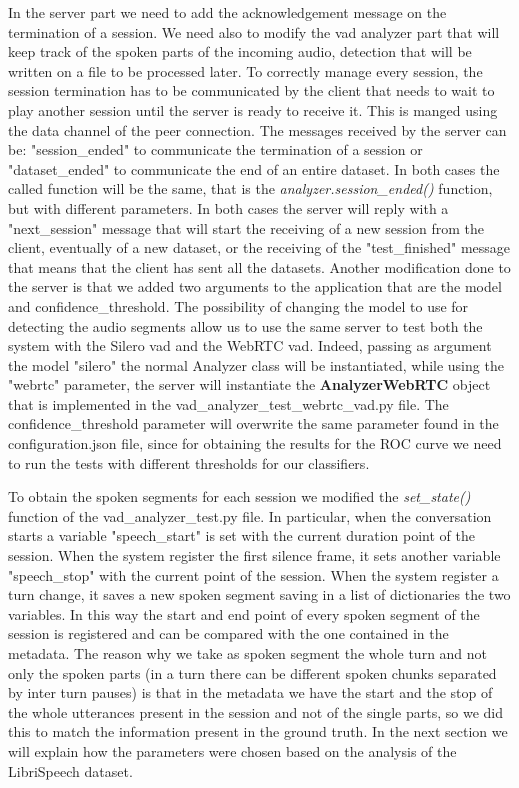 \documentclass[../main.tex]{subfiles}
\begin{document}
In the server part we need to add the acknowledgement message on the termination of a session. We need also to modify the vad analyzer part that will keep track of the spoken parts of the incoming audio, detection that will be written on a file to be processed later. To correctly manage every session, the session termination has to be communicated by the client that needs to wait to play another session until the server is ready to receive it. This is manged using the data channel of the peer connection. The messages received by the server can be: "session\_ended" to communicate the termination of a session or "dataset\_ended" to communicate the end of an entire dataset. In both cases the called function will be the same, that is the \textit{analyzer.session\_ended()} function, but with different parameters. In both cases the server will reply with a "next\_session" message that will start the receiving of a new session from the client, eventually of a new dataset, or the receiving of the "test\_finished" message that means that the client has sent all the datasets. Another modification done to the server is that we added two arguments to the application that are the model and confidence\_threshold. The possibility of changing the model to use for detecting the audio segments allow us to use the same server to test both the system with the Silero vad and the WebRTC vad. Indeed, passing as argument the model "silero" the normal Analyzer class will be instantiated, while using the "webrtc" parameter, the server will instantiate the \textbf{AnalyzerWebRTC} object that is implemented in the vad\_analyzer\_test\_webrtc\_vad.py file. The confidence\_threshold parameter will overwrite the same parameter found in the configuration.json file, since for obtaining the results for the ROC curve we need to run the tests with different thresholds for our classifiers. 

To obtain the spoken segments for each session we modified the \textit{set\_state()} function of the vad\_analyzer\_test.py file. In particular, when the conversation starts a variable "speech\_start" is set with the current duration point of the session. When the system register the first silence frame, it sets another variable "speech\_stop" with the current point of the session. When the system register a turn change, it saves a new spoken segment saving in a list of dictionaries the two variables. In this way the start and end point of every spoken segment of the session is registered and can be compared with the one contained in the metadata. The reason why we take as spoken segment the whole turn and not only the spoken parts (in a turn there can be different spoken chunks separated by inter turn pauses) is that in the metadata we have the start and the stop of the whole utterances present in the session and not of the single parts, so we did this to match the information present in the ground truth. In the next section we will explain how the parameters were chosen based on the analysis of the LibriSpeech dataset.
\end{document}

